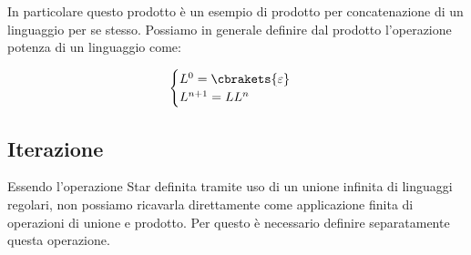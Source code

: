 In particolare questo prodotto è un esempio di prodotto per concatenazione di un linguaggio per se stesso. Possiamo in generale definire dal prodotto l'operazione potenza di un linguaggio come:

\begin{equation}
  \begin{cases}
    L^0=\cbrakets{\varepsilon}\\
    L^{n+1}=LL^n
  \end{cases}
\end{equation}

\subsection{Iterazione}


Essendo l'operazione Star definita tramite uso di un unione infinita di linguaggi regolari, non possiamo ricavarla direttamente come applicazione finita di operazioni di unione e prodotto. Per questo è necessario definire separatamente questa operazione.

